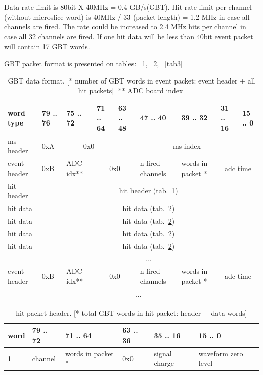 \documentclass{article}
\begin{document}
Data rate limit is 80bit X 40MHz = 0.4 GB/s(GBT). Hit rate limit per channel (without microslice word) is 40MHz / 33 (packet length) = 1,2 MHz in case all channels are fired. The rate could be increased to  2.4 MHz hits per channel in case all 32 channels are fired. If one hit data will be less than 40bit event packet will contain 17 GBT words.

GBT packet format is presented on tables: ~\ref{tab1}, ~\ref{tab2}, ~\ref{tab3}

\begin{table}[H]
\centering
\begin{tabular}{| l | l | l | l | l | l | l | l | l |}
\hline
word type & 79 .. 76 & 75 .. 72 & 71 .. 64 & 63 .. 48 & 47 .. 40 & 39 .. 32 & 31 .. 16 & 15 .. 0 \\ \hline
ms header & 0xA & \multicolumn{2}{c|}{0x0}  & \multicolumn{5}{c|}{ms index} \\ \hline
event header & 0xB & ADC idx** & \multicolumn{2}{c|}{0x0} & n fired channels & words in packet * & \multicolumn{2}{c|}{adc time} \\ \hline
hit header & \multicolumn{8}{c|}{hit header (tab.~\ref{tab1})} \\ \hline
hit data & \multicolumn{8}{c|}{hit data (tab.~\ref{tab2})} \\ \hline
hit data & \multicolumn{8}{c|}{hit data (tab.~\ref{tab2})} \\ \hline
hit data & \multicolumn{8}{c|}{hit data (tab.~\ref{tab2})} \\ \hline
hit data & \multicolumn{8}{c|}{hit data (tab.~\ref{tab2})} \\ \hline
  & \multicolumn{8}{c|}{ ... } \\ \hline

event header & 0xB & ADC idx** & \multicolumn{2}{c|}{0x0} & n fired channels & words in packet * & \multicolumn{2}{c|}{adc time} \\ \hline
  & \multicolumn{7}{c|}{ ... } \\ \hline

\end{tabular}
\caption{GBT data format. [* number of GBT words in event packet: event header + all hit packets] [** ADC board index] \label{tab1}}
\end{table}

\begin{table}[H]
\centering
\begin{tabular}{| l | l | l | l | l | l |}
\hline
word & 79 .. 72 & 71 .. 64 & 63 .. 36 & 35 .. 16 & 15 .. 0 \\ \hline
1 & channel &words in packet *& 0x0 & signal charge & waveform zero level \\ \hline
\end{tabular}
\caption{hit packet header. [* total GBT words in hit packet: header + data words]\label{tab2}}
\end{table}
\end{document}
